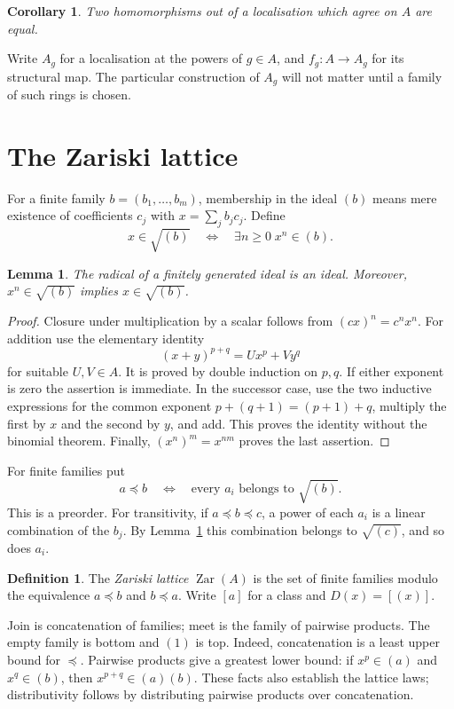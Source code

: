 \documentclass[11pt]{amsart}
\newtheorem{lemma}[theorem]{Lemma}
\newtheorem{corollary}[theorem]{Corollary}
\theoremstyle{definition}
\newtheorem{definition}[theorem]{Definition}
\theoremstyle{remark}
\newcommand{\Zar}{\operatorname{Zar}}
\newcommand{\rad}{\sqrt}
\begin{document}
\begin{corollary}\label{cor:agree}
Two homomorphisms out of a localisation which agree on $A$ are equal.
\end{corollary}

Write $A_g$ for a localisation at the powers of $g\in A$, and
$f_g:A\to A_g$ for its structural map. The particular construction of
$A_g$ will not matter until a family of such rings is chosen.

\section{The Zariski lattice}

For a finite family $b=(b_1,\ldots,b_m)$, membership in the ideal $(b)$
means mere existence of coefficients $c_j$ with $x=\sum_j b_jc_j$.
Define
\[
 x\in\rad{(b)}\quad\Longleftrightarrow\quad
 \exists n\geq0\; x^n\in(b).
\]

\begin{lemma}\label{lem:radical}
The radical of a finitely generated ideal is an ideal. Moreover,
$x^n\in\rad{(b)}$ implies $x\in\rad{(b)}$.
\end{lemma}
\begin{proof}
Closure under multiplication by a scalar follows from
$(cx)^n=c^nx^n$. For addition use the elementary identity
\[
 (x+y)^{p+q}=U x^p+V y^q
\]
for suitable $U,V\in A$. It is proved by double induction on $p,q$.
If either exponent is zero the assertion is immediate. In the successor
case, use the two inductive expressions for the common exponent
$p+(q+1)=(p+1)+q$, multiply the first by $x$ and the second by $y$, and
add. This proves the identity without the binomial theorem.
Finally, $(x^n)^m=x^{nm}$ proves the last assertion.
\end{proof}

For finite families put
\[
 a\preceq b\quad\Longleftrightarrow\quad
 \text{every }a_i\text{ belongs to }\rad{(b)}.
\]
This is a preorder. For transitivity, if $a\preceq b\preceq c$, a power
of each $a_i$ is a linear combination of the $b_j$. By
Lemma~\ref{lem:radical} this combination belongs to $\rad{(c)}$, and so
does $a_i$.

\begin{definition}
The \emph{Zariski lattice} $\Zar(A)$ is the set of finite families modulo
the equivalence $a\preceq b$ and $b\preceq a$. Write $[a]$ for a class
and $D(x)=[(x)]$.
\end{definition}

Join is concatenation of families; meet is the family of pairwise
products. The empty family is bottom and $(1)$ is top. Indeed,
concatenation is a least upper bound for $\preceq$. Pairwise products
give a greatest lower bound: if $x^p\in(a)$ and $x^q\in(b)$, then
$x^{p+q}\in(a)(b)$. These facts also establish the lattice laws;
distributivity follows by distributing pairwise products over
concatenation.
\end{document}
